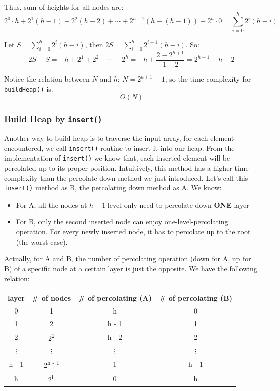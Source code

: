 \documentclass[11pt]{book}
\begin{document}
Thus, sum of heights for all nodes are:
\[
2^0 \cdot h + 2^1(h - 1) + 2^2(h - 2) + \cdots + 2^{h - 1}(h - (h - 1)) + 2^h \cdot 0 = \sum_{i = 0}^{h}2^i(h - i)
\]

Let \(S = \sum_{i = 0}^{h}2^i(h - i)\), then \(2S = \sum_{i = 0}^{h}2^{i + 1}(h - i)\). So:
\[
2S - S = -h + 2^1 + 2^2 + \cdots + 2^h = -h + \frac {2 - 2^{h + 1}} {1 - 2}
= 2^{h + 1} - h - 2
\]

Notice the relation between \(N\) and \(h\): \(N = 2^{h + 1} - 1\), so the time complexity for \texttt{buildHeap()} is:
\[
O(N)
\]
\subsubsection{Build Heap by \texttt{insert()}}
\label{sec:orgbb4b2f9}
Another way to build heap is to traverse the input array, for each element encountered, we call \texttt{insert()} routine to insert it into our heap. From the implementation of \texttt{insert()} we know that, each inserted element will be percolated up to its proper position. Intuitively, this method has a higher time complexity than the percolate down method we just introduced. Let's call this \texttt{insert()} method as B, the percolating down method as A. We know:
\begin{itemize}
\item For A, all the nodes at \(h - 1\) level only need to percolate down \textbf{ONE} layer
\item For B, only the second inserted node can enjoy one-level-percolating operation. For every newly inserted node, it has to percolate up to the root (the worst case).
\end{itemize}

Actually, for A and B, the number of percolating operation (down for A, up for B) of a specific node at a certain layer is just the opposite. We have the following relation:
\begin{center}
\begin{tabular}{cccc}
\hline
layer & \# of nodes & \# of percolating (A) & \# of percolating (B)\\
\hline
0 & 1 & h & 0\\
1 & 2 & h - 1 & 1\\
2 & 2\textsuperscript{2} & h - 2 & 2\\
\(\vdots\) & \(\vdots\) & \(\vdots\) & \(\vdots\)\\
h - 1 & 2\textsuperscript{h - 1} & 1 & h - 1\\
h & 2\textsuperscript{h} & 0 & h\\
\hline
\end{tabular}
\end{center}
\end{document}
